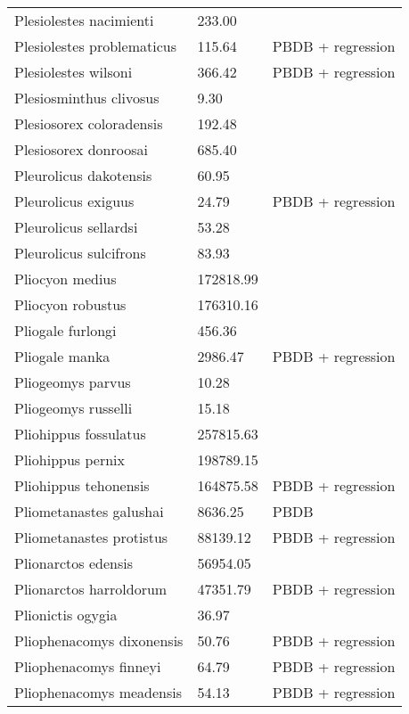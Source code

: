 \begin{center}
\begin{longtable}{p{} p{} p{} }
  Plesiolestes nacimienti & 233.00 & \cite{Soligo2006} \\ 
  Plesiolestes problematicus & 115.64 & PBDB + regression \\ 
  Plesiolestes wilsoni & 366.42 & PBDB + regression \\ 
  Plesiosminthus clivosus & 9.30 & \cite{Tomiya2013} \\ 
  Plesiosorex coloradensis & 192.48 & \cite{Tomiya2013} \\ 
  Plesiosorex donroosai & 685.40 & \cite{Tomiya2013} \\ 
  Pleurolicus dakotensis & 60.95 & \cite{Tomiya2013} \\ 
  Pleurolicus exiguus & 24.79 & PBDB + regression \\ 
  Pleurolicus sellardsi & 53.28 & \cite{Zakrzewski1991a} \\ 
  Pleurolicus sulcifrons & 83.93 & \cite{Tomiya2013} \\ 
  Pliocyon medius & 172818.99 & \cite{Tomiya2013} \\ 
  Pliocyon robustus & 176310.16 & \cite{Tomiya2013} \\ 
  Pliogale furlongi & 456.36 & \cite{Wood1962} \\ 
  Pliogale manka & 2986.47 & PBDB + regression \\ 
  Pliogeomys parvus & 10.28 & \cite{Tomiya2013} \\ 
  Pliogeomys russelli & 15.18 & \cite{Tomiya2013} \\ 
  Pliohippus fossulatus & 257815.63 & \cite{Tomiya2013} \\ 
  Pliohippus pernix & 198789.15 & \cite{Tomiya2013} \\ 
  Pliohippus tehonensis & 164875.58 & PBDB + regression \\ 
  Pliometanastes galushai & 8636.25 & PBDB \\ 
  Pliometanastes protistus & 88139.12 & PBDB + regression \\ 
  Plionarctos edensis & 56954.05 & \cite{Tomiya2013} \\ 
  Plionarctos harroldorum & 47351.79 & PBDB + regression \\ 
  Plionictis ogygia & 36.97 & \cite{Tomiya2013} \\ 
  Pliophenacomys dixonensis & 50.76 & PBDB + regression \\ 
  Pliophenacomys finneyi & 64.79 & PBDB + regression \\ 
  Pliophenacomys meadensis & 54.13 & PBDB + regression \\ 

\end{longtable}
\end{center}
